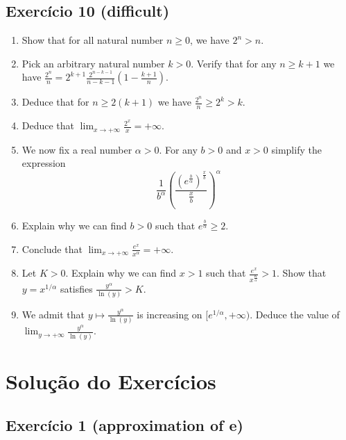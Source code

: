 \subsection*{Exercício 10 (difficult)}

\begin{enumerate}
  \item Show that for all natural number $n \geq 0$, we have $2^n > n$.
  \item Pick an arbitrary natural number $k > 0$.
    Verify that for any $n \geq k+1$ we have
    $\frac{2^n}{n} = 2^{k+1}
    \frac{2^{n-k-1}}{n-k-1} \left(1-\frac{k+1}{n}\right)$.
  \item Deduce that for $n \geq 2{(k+1)}$ we have
    $\frac{2^n}{n} \geq 2^k > k$.
  \item Deduce that $\lim_{x \rightarrow +\infty} \frac{2^x}{x} = +\infty$.
  \item We now fix a real number $\alpha > 0$. For any $b > 0$
    and $x > 0$ simplify the expression
    $$
    \frac{1}{b^\alpha} \left( \frac{\left(e^{\frac{b}{\alpha}}\right)^{\frac{x}{b}}}{\frac{x}{b}} \right)^\alpha
    $$
  \item Explain why we can find $b > 0$ such that
    $e^{\frac{b}{\alpha}} \geq 2$.

  \item Conclude that
    $\lim_{x \rightarrow +\infty} \frac{e^x}{x^\alpha} = +\infty$.

  \item Let $K > 0$. Explain why we can find $x > 1$ such that
    $\frac{e^x}{x^{\frac{K}{\alpha}}} > 1$.
    Show that $y = x^{1/\alpha}$ satisfies
    $\frac{y^{\alpha}}{\ln{(y)}} > K$.
  \item We admit that $y \mapsto \frac{y^{\alpha}}{\ln{(y)}}$ is increasing
  on $[e^{1/\alpha}, +\infty)$.
    Deduce the value of
    ${\lim_{y \rightarrow +\infty} \frac{y^\alpha}{\ln{(y)}}}$.

\end{enumerate}

\section{Solução do Exercícios}

\subsection*{Exercício 1 (approximation of e)}

